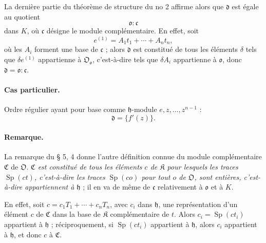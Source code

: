 La dernière partie du théorème de structure du no 2 affirme alors que $\mathfrak d$ est égale au quotient
\[
\mathfrak o:\mathfrak c
\]
dans $K$, où $\mathfrak c$ désigne le module complémentaire. En effet, soit
\[
e^{(1)}=A_1t_1+\cdots+A_nt_n,
\]
où les $A_i$ forment une base de $\mathfrak c$ ; alors $\mathfrak d$ est constitué de tous les éléments $\delta$ tels que $\delta e^{(1)}$ appartienne à $\mathfrak O_{\mathfrak o}$, c'est-à-dire tels que $\delta A_i$ appartienne à $\mathfrak o$, donc $\mathfrak d=\mathfrak o:\mathfrak c$.

\paragraph{Cas particulier.}
Ordre régulier ayant pour base comme $\mathfrak h$-module $e,z,\ldots,z^{n-1}$ :
\[
\mathfrak d=\{f'(z)\}.
\]

\paragraph{Remarque.}
La remarque du \S{} 5, 4 donne l'autre définition connue du module complémentaire $\mathfrak C$ de $\mathfrak O$. \emph{$\mathfrak C$ est constitué de tous les éléments $c$ de $\mathfrak K$ pour lesquels les traces $\operatorname{Sp}(ct)$, c'est-à-dire les traces $\operatorname{Sp}(co)$ pour tout $o$ de $\mathfrak O$, sont entières, c'est-à-dire appartiennent à $\mathfrak h$} ; il en va de même de $\mathfrak c$ relativement à $\mathfrak o$ et à $K$.

En effet, soit $c=c_1T_1+\cdots+c_nT_n$, avec $c_i$ dans $\mathfrak h$, une représentation d'un élément $c$ de $\mathfrak C$ dans la base de $\mathfrak K$ complémentaire de $t$. Alors $c_i=\operatorname{Sp}(ct_i)$ appartient à $\mathfrak h$ ; réciproquement, si $\operatorname{Sp}(ct_i)$ appartient à $\mathfrak h$, alors $c_i$ appartient à $\mathfrak h$, et donc $c$ à $\mathfrak C$.

